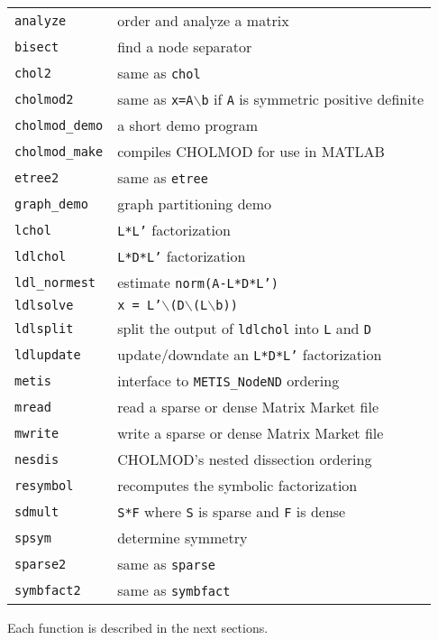 \documentclass[11pt]{article}
\begin{document}
\vspace{0.1in}
\begin{tabular}{ll}
\hline
{\tt analyze}	    & order and analyze a matrix \\
{\tt bisect}	    & find a node separator \\
{\tt chol2}	    & same as {\tt chol} \\
{\tt cholmod2}	    & same as {\tt x=A}$\backslash${\tt b} if {\tt A} is symmetric positive definite \\
{\tt cholmod\_demo} & a short demo program \\
{\tt cholmod\_make} & compiles CHOLMOD for use in MATLAB \\
{\tt etree2}	    & same as {\tt etree} \\
{\tt graph\_demo}   & graph partitioning demo \\
{\tt lchol}	    & {\tt L*L'} factorization \\
{\tt ldlchol}	    & {\tt L*D*L'} factorization \\
{\tt ldl\_normest}  & estimate {\tt norm(A-L*D*L')} \\
{\tt ldlsolve}	    & {\tt x = L'}$\backslash${\tt (D}$\backslash${\tt (L}$\backslash${\tt b))} \\
{\tt ldlsplit}	    & split the output of {\tt ldlchol} into {\tt L} and {\tt D} \\
{\tt ldlupdate}	    & update/downdate an {\tt L*D*L'} factorization \\
{\tt metis}	    & interface to {\tt METIS\_NodeND} ordering \\
{\tt mread}	    & read a sparse or dense Matrix Market file \\
{\tt mwrite}	    & write a sparse or dense Matrix Market file \\
{\tt nesdis}	    & CHOLMOD's nested dissection ordering \\
{\tt resymbol}	    & recomputes the symbolic factorization \\
{\tt sdmult}	    & {\tt S*F} where {\tt S} is sparse and {\tt F} is dense \\
{\tt spsym}	    & determine symmetry \\
{\tt sparse2}	    & same as {\tt sparse} \\
{\tt symbfact2}	    & same as {\tt symbfact} \\
\hline
\end{tabular}

\vspace{0.1in}\noindent
Each function is described in the next sections.
\end{document}

